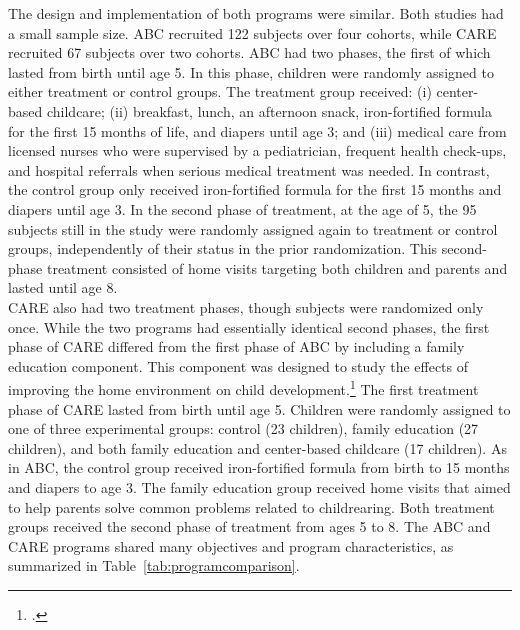 \noindent The design and implementation of both programs were similar. Both studies had a small sample size. ABC recruited 122 subjects over four cohorts, while CARE recruited 67 subjects over two cohorts. ABC had two phases, the first of which lasted from birth until age 5. In this phase, children were randomly assigned to either treatment or control groups. The treatment group received: (i) center-based childcare; (ii) breakfast, lunch, an afternoon snack, iron-fortified formula for the first 15 months of life, and diapers until age 3; and (iii) medical care from licensed nurses who were supervised by a pediatrician, frequent health check-ups, and hospital referrals when serious medical treatment was needed. In contrast, the control group only received iron-fortified formula for the first 15 months and diapers until age 3. In the second phase of treatment, at the age of 5, the 95 subjects still in the study were randomly assigned again to treatment or control groups, independently of their status in the prior randomization. This second-phase treatment consisted of home visits targeting both children and parents and lasted until age 8.\\ 

\noindent  CARE also had two treatment phases, though subjects were randomized only once. While the two programs had essentially identical second phases, the first phase of CARE differed from the first phase of ABC by including a family education component. This component was designed to study the effects of improving the home environment on child development.\footnote{\citet{Wasik_Ramey_etal_1990_CD}.} The first treatment phase of CARE lasted from birth until age 5. Children were randomly assigned to one of three experimental groups: control (23 children), family education (27 children), and both family education and center-based childcare (17 children). As in ABC, the control group received iron-fortified formula from birth to 15 months and diapers to age 3. The family education group received home visits that aimed to help parents solve common problems related to childrearing. Both treatment groups received the second phase of treatment from ages 5 to 8. The ABC and CARE programs shared many objectives and program characteristics, as summarized in Table~\ref{tab:programcomparison}.\\

